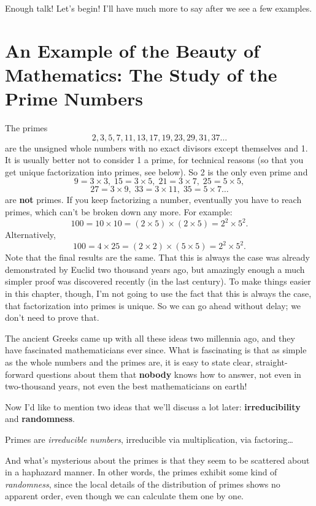 \documentclass[12pt]{book}
\begin{document}
Enough talk! Let's begin! I'll have much more to say after we see a few examples.

\section*{An Example of the Beauty of Mathematics: The Study of the Prime Numbers}

The primes 
\[
   2, 3, 5, 7, 11, 13, 17, 19, 23, 29, 31, 37 \ldots 
\]
are the unsigned whole numbers with
no exact divisors except themselves and 1.  It is usually better not to consider 1 a prime,
for technical reasons (so that you get unique factorization into primes, see below).
So 2 is the only even prime and 
\[
   9 = 3 \times 3, \; 15 = 3 \times 5, \; 21 = 3 \times 7, \; 25 = 5 \times 5,  
\]
\[
   27 = 3 \times 9, \; 33 = 3 \times 11, \; 35 = 5 \times 7 \ldots
\]
are \textbf{not} primes.
If you keep factorizing a number, eventually you have to reach primes, which
can't be broken down any more. For example:
\[
   100 = 10 \times 10  = (2 \times 5) \times (2 \times 5) = 2^2 \times 5^2. 
\]
Alternatively, 
\[
   100 = 4 \times 25 = (2 \times 2) \times (5 \times 5) = 2^2 \times 5^2.
\]
Note that the final results are the same.  That this is always the case was already
demonstrated by Euclid two thousand years ago, 
but amazingly enough a much simpler proof was discovered recently (in the last century).
To make things easier in this chapter, though, 
I'm not going to use the fact that this is always the case, 
that factorization into primes is unique. So
we can go ahead without delay; we don't need to prove that.

The ancient Greeks came up with all these ideas two millennia ago, and they have fascinated
mathematicians ever since.
What is fascinating is that as simple as the whole numbers and the primes are, it is easy
to state clear, straight-forward questions about them that \textbf{nobody} knows how to answer, 
not even in two-thousand
years, not even the best mathematicians on earth!

Now I'd like to mention two ideas that we'll discuss a lot later: \textbf{irreducibility} and 
\textbf{randomness}.

Primes are \emph{irreducible numbers}, irreducible via multiplication, via factoring\ldots

And
what's mysterious about the primes is that they seem to be scattered about in a haphazard manner.
In other words,
the primes exhibit some kind of \emph{randomness}, since the local details of the distribution
of primes shows no apparent order,
even though we can calculate them one by one.
\end{document}
